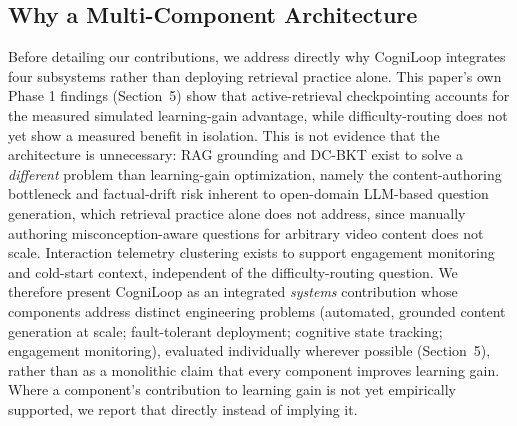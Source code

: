\documentclass[notitlepage,12pt]{jedm}
\begin{document}
\subsection{Why a Multi-Component Architecture}
Before detailing our contributions, we address directly why CogniLoop integrates four subsystems rather than deploying retrieval practice alone. This paper's own Phase 1 findings (Section~5) show that active-retrieval checkpointing accounts for the measured simulated learning-gain advantage, while difficulty-routing does not yet show a measured benefit in isolation. This is not evidence that the architecture is unnecessary: RAG grounding and DC-BKT exist to solve a \emph{different} problem than learning-gain optimization, namely the content-authoring bottleneck and factual-drift risk inherent to open-domain LLM-based question generation, which retrieval practice alone does not address, since manually authoring misconception-aware questions for arbitrary video content does not scale. Interaction telemetry clustering exists to support engagement monitoring and cold-start context, independent of the difficulty-routing question. We therefore present CogniLoop as an integrated \emph{systems} contribution whose components address distinct engineering problems (automated, grounded content generation at scale; fault-tolerant deployment; cognitive state tracking; engagement monitoring), evaluated individually wherever possible (Section~5), rather than as a monolithic claim that every component improves learning gain. Where a component's contribution to learning gain is not yet empirically supported, we report that directly instead of implying it.
\end{document}
